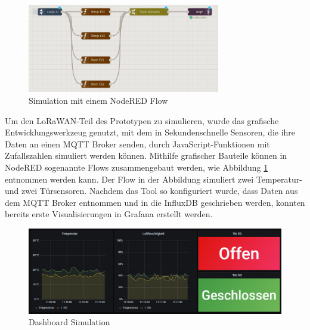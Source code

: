 \begin{figure}[H]
  \vspace{10pt}
  \begin{center}
    \includegraphics[width=0.75\textwidth]{./images/nodered.png}  
    \end{center}
  \vspace{-5pt}
  \caption[Simulation mit einem NodeRED Flow]{Simulation mit einem NodeRED Flow}
  \label{fig:nodered}
  \vspace{-10pt}
\end{figure}

Um den LoRaWAN-Teil des Prototypen zu simulieren, wurde das grafische Entwicklungswerkzeug  genutzt, mit dem in Sekundenschnelle Sensoren, die ihre Daten an einen MQTT Broker senden, durch JavaScript-Funktionen mit Zufallszahlen simuliert werden können. Mithilfe grafischer Bauteile können in NodeRED sogenannte Flows zusammengebaut werden, wie Abbildung \ref{fig:nodered} entnommen werden kann. Der Flow in der Abbildung simuliert zwei Temperatur- und zwei Türsensoren. Nachdem das Tool  so konfiguriert wurde, dass Daten aus dem MQTT Broker entnommen und in die InfluxDB geschrieben werden, konnten bereits erste Visualisierungen in Grafana erstellt werden. 

\begin{figure}[H]
  \vspace{10pt}
  \begin{center}
    \includegraphics[width=1\textwidth]{./images/simple-dashboard.png}  
    \end{center}
  \vspace{-5pt}
  \caption[Dashboard Simulation]{Dashboard Simulation}
  \label{fig:dashboard-sim}
  \vspace{-10pt}
\end{figure}

